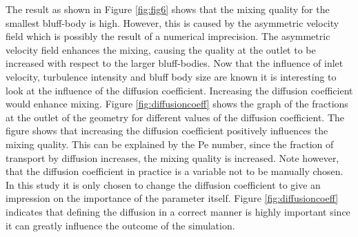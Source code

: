 \documentclass{CFD2017}
\begin{document}
The result as shown in Figure \ref{fig:fig6} shows that the mixing quality for the smallest bluff-body is high. However, this is caused by the asymmetric velocity field which is possibly the result of a numerical imprecision. The asymmetric velocity field enhances the mixing, causing the quality at the outlet to be increased with respect to the larger bluff-bodies.
\newline
Now that the influence of inlet velocity, turbulence intensity and bluff body size are known it is interesting to look at the influence of the diffusion coefficient. Increasing the diffusion coefficient would enhance mixing. Figure \ref{fig:diffusioncoeff} shows the graph of the fractions at the outlet of the geometry for different values of the diffusion coefficient. The figure shows that increasing the diffusion coefficient positively influences the mixing quality. This can be explained by the Pe number, since the fraction of transport by diffusion increases, the mixing quality is increased. Note however, that the diffusion coefficient in practice is a variable not to be manually chosen. In this study it is only chosen to change the diffusion coefficient to give an impression on the importance of the parameter itself. Figure \ref{fig:diffusioncoeff} indicates that defining the diffusion in a correct manner is highly important since it can greatly influence the outcome of the simulation.


\end{document}
